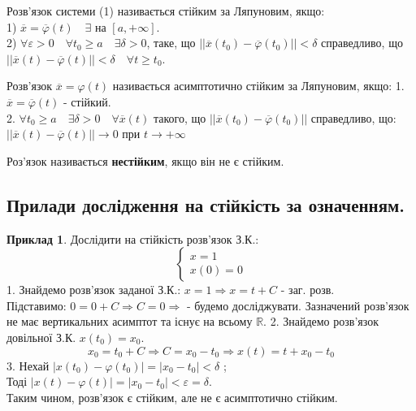 \documentclass[14pt,a4paper]{scrartcl}
\theoremstyle{definition}
\newtheorem*{example}{Приклад}
\theoremstyle{remark}
\theoremstyle{definition}
\theoremstyle{definition}
\begin{document}
\bd Розв'язок системи (1) називається стійким за Ляпуновим, якщо:\\
1) $\overline{x} = \overline{\varphi } (t)  \quad \exists$ на $[a, +\infty]$.\\
2) $\forall \varepsilon > 0 \quad \forall t_0 \geq a \quad \exists \delta > 0$, таке, що $ \left|\left| \overline{x}(t_0) - \overline{\varphi}(t_0) \right|\right| < \delta $ справедливо, що $ \left| \left|
\overline{x} (t) - \overline{\varphi} (t)
  \right|  \right|  < \delta  \quad \forall t \geq t_0$.
\ed

\bd
Розв'язок $ \overline{x} = \varphi(t) $ називається асимптотично стійким за Ляпуновим, якщо:
1. $ \overline{x} = \overline{\varphi} (t)$ - стійкий.\\
2. $\forall t_0 \geq a \quad \exists \delta > 0 \quad \forall \overline{x} (t) $ такого, що $ \left|
\left|  \overline{x} (t_0) - \overline{\varphi} (t_0) \right|
 \right| $ справедливо, що: \\ $  \left|
 \left|  \overline{x} (t) - \overline{\varphi} (t) \right|
  \right| \to 0   $ при $ t \to + \infty$
\ed

\def\vx{\overline{x}}
\def\vphi{\overline{\varphi}}
\def\vf{\overline{f}}

\bd
Роз'язок називається \textbf{нестійким}, якщо він не є стійким.
\ed

\subsection{Прилади дослідження на стійкість за означенням.}

\begin{example}
    Дослідити на стійкість розв'язок З.К.:
$$
\begin{cases}
    x = 1 \\
    x(0) = 0
\end{cases}
$$
1. Знайдемо розв'язок заданої З.К.: $x = 1 \Rightarrow x = t + C$ - заг. розв.\\
Підставимо: $ 0 = 0 + C \Longrightarrow C = 0 \Longrightarrow $  - будемо досліджувати.
Зазначений розв'язок не має вертикальних асимптот та існує на всьому $\mathbb{R}$.
2. Знайдемо розв'язок довільної З.К. $x(t_0) = x_0$.
$$
x_0 = t_0 + C \Rightarrow C = x_0 - t_0 \Rightarrow x(t) = t + x_0 - t_0
$$
3. Нехай $  \left| x(t_0) - \varphi(t_0) \right|  =  \left| x_0 - t_0 \right| < \delta  $ ;\\
Тоді $ \left| x (t) - \varphi (t) \right|  = \left|  x_0 - t_0 \right| < \varepsilon = \delta $.\\
Таким чином, розв'язок є стійким, але не є асимптотично стійким.

\end{example}
\end{document}

